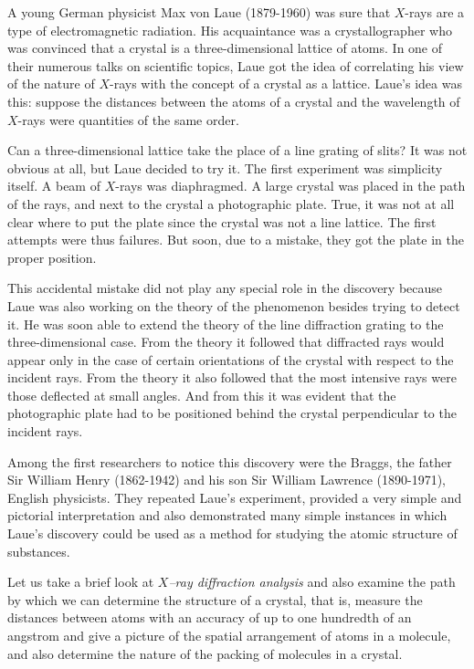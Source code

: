 A young German physicist Max von Laue (1879-1960) was sure that $X$-rays are a type of electromagnetic radia­tion. His acquaintance was a crystallographer who was convinced that a crystal is a three-dimensional lattice of atoms. In one of their numerous talks on scientific topics, Laue got the idea of correlating his view of the nature of $X$-rays with the concept of a crystal as a lattice. Laue's idea was this: suppose the distances between the atoms of a crystal and the wavelength of $X$-rays were quantities of the same order.

Can a three-dimensional lattice take the place of a line grating of slits? It was not obvious at all, but Laue decided to try it. The first experiment was simplicity itself. A beam of $X$-rays was diaphragmed. A large crystal was placed in the path of the rays, and next to the crystal a photographic plate. True, it was not at all clear where to put the plate since the crystal was not a line lattice. The first attempts were thus failures. But soon, due to a mistake, they got the plate in the proper position.

This accidental mistake did not play any special role in the discovery because Laue was also working on the theory of the phenomenon besides trying to detect it. He was soon able to extend the theory of the line dif­fraction grating to the three-dimensional case. From the theory it followed that diffracted rays would appear only in the case of certain orientations of the crystal with respect to the incident rays. From the theory it also fol­lowed that the most intensive rays were those deflected
at small angles. And from this it was evident that the photographic plate had to be positioned behind the crystal perpendicular to the incident rays.

Among the first researchers to notice this discovery were the Braggs, the father Sir William Henry (1862-1942) and his son Sir William Lawrence (1890-1971), English physicists. They repeated Laue's experiment, provided a very simple and pictorial interpretation and also demonstrated many simple instances in which Laue's discovery could be used as a method for studying the atomic structure of substances.

Let us take a brief look at \emph{$X$\!--ray diffraction analysis} and also examine the path by which we can determine the structure of a crystal, that is, measure the distances between atoms with an accuracy of up to one hundredth of an angstrom and give a picture of the spatial arrange­ment of atoms in a molecule, and also determine the nature of the packing of molecules in a crystal.

